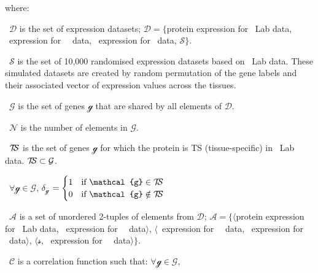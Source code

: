     where:
     \quad\begin{eqlist}[\setlength{\itemsep}{0em}%
         \setlength{\topsep}{0em}%
         \setlength{\partopsep}{0em}%
         \setlength{\parskip}{0em}%
         \setlength{\parsep}{0em}]
         \item[\textbullet\ $\mathcal{D}$] is the set of expression datasets;
             $\mathcal{D}=\{$protein expression for \pandey\ Lab data,
             \mRNA\ expression for \uhlen\ \etal\ data,
             \mRNA\ expression for \gtex\ data, $\mathcal{S}\}$.
         \item[\textbullet\ $\mathcal{S}$] is the set of 10,000
             randomised expression datasets based on \pandey\ Lab data.
             These simulated datasets are created
             by random permutation of the gene labels and
             their associated vector of expression values across the tissues.
         \item[\textbullet\ $\mathcal{G}$] is the set of genes $\mathcal{g}$
             that are shared by all elements of $\mathcal{D}$.
         \item[\textbullet\ $\mathcal{N}$] is the number of elements
             in $\mathcal{G}$.
         \item[\textbullet\ $\TSm$] is the set of genes $\mathcal{g}$
             for which the protein is \gls{TS} (tissue-specific)
             in \pandey\ Lab data.
             $\TSm \subset \mathcal{G}$.
         \item[\textbullet\ $\forall \mathcal{g} \in \mathcal{G}$,
             $\delta_{\mathcal{g}}$]$=\begin{cases}
                 1 & \text{if $\mathcal{g} \in \TSm$}\\
                 0 & \text{if $\mathcal{g} \notin \TSm$}
 \end{cases}       $
         \item[\textbullet\ $\mathcal{A}$] is a set of unordered 2-tuples
              of elements from $\mathcal{D}$;
              $\mathcal{A}=\{\langle$protein expression for \pandey\ Lab data,
              \mRNA\ expression for \uhlen\ \etal\ data$\rangle$,
              $\langle$\mRNA\ expression for \uhlen\ \etal\ data,
              \mRNA\ expression for \gtex\ data$\rangle$,
              $\langle \mathcal{s}$,
              \mRNA\ expression for \uhlen\ \etal\ data$\rangle\}$.
         \item[\textbullet\ $\mathcal{C}$] is a correlation function such that:
             $\forall \mathcal{g} \in \mathcal{G}$,

\end{eqlist}
